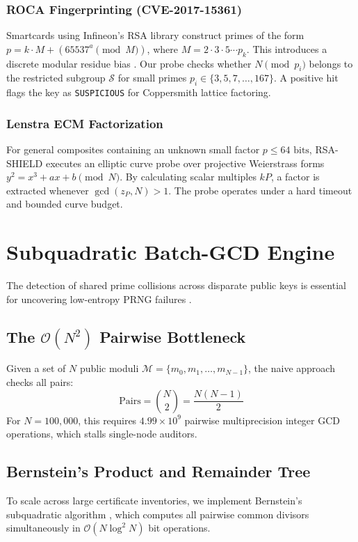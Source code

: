 \documentclass[sigconf,nonacm]{acmart}
\begin{document}
\subsubsection{ROCA Fingerprinting (CVE-2017-15361)}
Smartcards using Infineon's RSA library construct primes of the form $p = k \cdot M + (65537^a \pmod M)$, where $M = 2 \cdot 3 \cdot 5 \cdots p_k$. This introduces a discrete modular residue bias \cite{nemec2017return}. Our probe checks whether $N \pmod{p_i}$ belongs to the restricted subgroup $\mathcal{S}$ for small primes $p_i \in \{3, 5, 7, \dots, 167\}$. A positive hit flags the key as \texttt{SUSPICIOUS} for Coppersmith lattice factoring.

\subsubsection{Lenstra ECM Factorization}
For general composites containing an unknown small factor $p \le 64\text{ bits}$, RSA-SHIELD executes an elliptic curve probe over projective Weierstrass forms $y^2 = x^3 + ax + b \pmod N$. By calculating scalar multiples $k P$, a factor is extracted whenever $\gcd(z_P, N) > 1$. The probe operates under a hard timeout and bounded curve budget.

\section{Subquadratic Batch-GCD Engine}
The detection of shared prime collisions across disparate public keys is essential for uncovering low-entropy PRNG failures \cite{heninger2012mining}. 

\subsection{The $\mathcal{O}(N^2)$ Pairwise Bottleneck}
Given a set of $N$ public moduli $\mathcal{M} = \{m_0, m_1, \dots, m_{N-1}\}$, the naive approach checks all pairs:
\begin{equation}
\text{Pairs} = \binom{N}{2} = \frac{N(N - 1)}{2}
\end{equation}
For $N = 100,000$, this requires $4.99 \times 10^9$ pairwise multiprecision integer GCD operations, which stalls single-node auditors.

\subsection{Bernstein's Product and Remainder Tree}
To scale across large certificate inventories, we implement Bernstein's subquadratic algorithm \cite{bernstein2004find}, which computes all pairwise common divisors simultaneously in $\mathcal{O}(N \log^2 N)$ bit operations.
\end{document}
